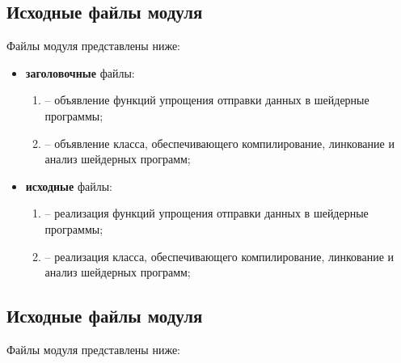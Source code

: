 \subsection{Исходные файлы модуля }

Файлы модуля представлены ниже:

\begin{itemize}[label=---]
    \item \textbf{заголовочные} файлы:
    \begin{enumerate}[label=\arabic*), labelsep=0.5em]
        \item {} -- объявление функций упрощения отправки данных в шейдерные программы;
        \item {} -- объявление класса, обеспечивающего компилирование, линкование и
        анализ шейдерных программ;
    \end{enumerate}
    \item \textbf{исходные} файлы:
    \begin{enumerate}[label=\arabic*), labelsep=0.5em]
        \item {} -- реализация функций упрощения отправки данных в шейдерные программы;
        \item {} -- реализация класса, обеспечивающего компилирование, линкование и
        анализ шейдерных программ;
    \end{enumerate}
\end{itemize}

\subsection{Исходные файлы модуля }

Файлы модуля представлены ниже:

